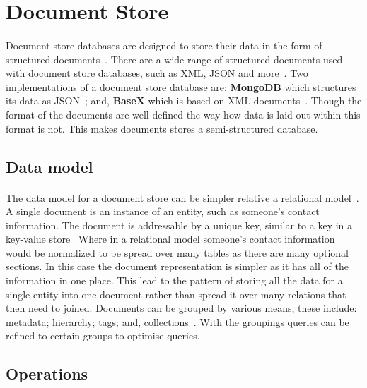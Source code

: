 \documentclass{CRPITStyle}
\renewcommand{\cite}{\citep}
\begin{document}

\section{Document Store}

\paragraph{}
Document store databases are designed to store their data in the form of
structured documents~\cite{base,nosql_survey}.
There are a wide range of structured documents used with document store
databases, such as XML, JSON and more~\cite{base,compare_nosql}.
Two implementations of a document store database are: \textbf{MongoDB} which
structures its data as JSON~\cite{base}; and, \textbf{BaseX} which is based on XML
documents~\cite{basex}.
Though the format of the documents are well defined the
way how data is laid out within this format is not.
This makes documents stores a semi-structured database.

\subsection{Data model}

\paragraph{}
The data model for a document store can be simpler relative a relational
model~\cite{nosql_survey}.
A single document is an instance of an entity, such as someone's contact information.
The document is addressable by a unique key, similar to a key in a key-value
store~\cite{nosql_survey,sql_nosql}
Where in a relational model someone's contact information would be
normalized to be spread over many tables as there are many optional
sections.
In this case the document representation is simpler as it has all of the
information in one place.
This lead to the pattern of storing all the data for a single entity into
one document rather than spread it over many relations that then need to
joined.
Documents can be grouped by various means,
these include: metadata; hierarchy; tags; and, collections~\cite{sql_nosql}.
With the groupings queries can be refined to certain groups to optimise
queries.

\subsection{Operations}
\end{document}

